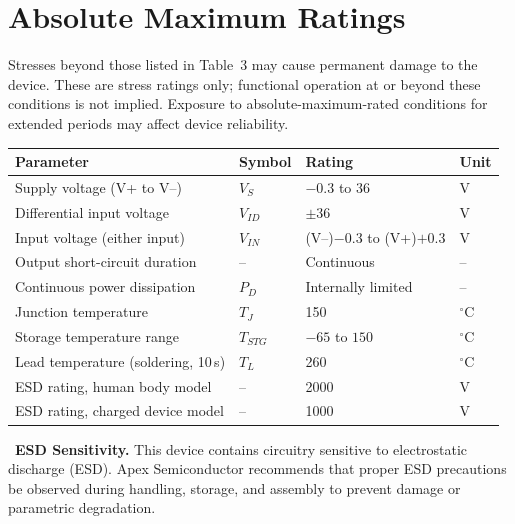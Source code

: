 \section{Absolute Maximum Ratings}
Stresses beyond those listed in Table~3 may cause permanent damage to the
device. These are stress ratings only; functional operation at or beyond
these conditions is not implied. Exposure to absolute-maximum-rated
conditions for extended periods may affect device reliability.

\begin{center}
\begin{tabular}{@{}L{6.0cm}C{1.8cm}C{3.6cm}C{1.6cm}@{}}
\toprule
{}
{\footnotesize\bfseries Parameter} & {\footnotesize\bfseries Symbol} & {\footnotesize\bfseries Rating} & {\footnotesize\bfseries Unit} \\
\midrule
Supply voltage (V+ to V--)                 & $V_S$      & $-0.3$ to $36$              & V \\
Differential input voltage                 & $V_{ID}$   & $\pm 36$                    & V \\
Input voltage (either input)                & $V_{IN}$   & (V--)$-0.3$ to (V+)$+0.3$   & V \\
Output short-circuit duration               & --         & Continuous                  & -- \\
Continuous power dissipation                & $P_D$      & Internally limited          & -- \\
Junction temperature                        & $T_J$      & 150                         & $^{\circ}$C \\
Storage temperature range                   & $T_{STG}$  & $-65$ to $150$              & $^{\circ}$C \\
Lead temperature (soldering, 10\,s)         & $T_L$      & 260                         & $^{\circ}$C \\
ESD rating, human body model                & --         & 2000                        & V \\
ESD rating, charged device model            & --         & 1000                        & V \\
\bottomrule
\end{tabular}
\end{center}

\begin{caution}
\faExclamationTriangle\ \textbf{ESD Sensitivity.} This device contains
circuitry sensitive to electrostatic discharge (ESD). Apex Semiconductor
recommends that proper ESD precautions be observed during handling, storage,
and assembly to prevent damage or parametric degradation.
\end{caution}

